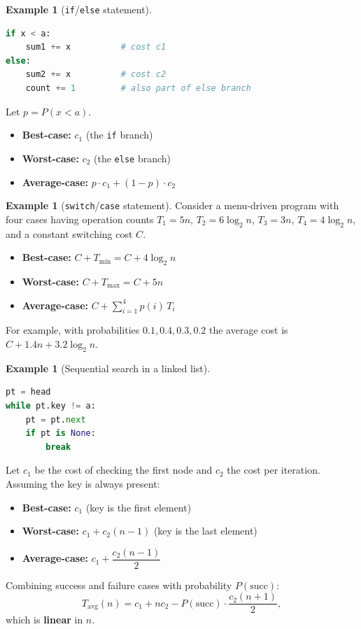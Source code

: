 \documentclass[11pt, a4paper, notitlepage]{report}
\theoremstyle{definition}
\theoremstyle{remark}
\theoremstyle{definition}
\newtheorem{example}[theorem]{Example}
\begin{document}
\begin{example}[\texttt{if}/\texttt{else} statement]
\label{ex:if-else}
\leavevmode
\begin{lstlisting}[language=Python]
if x < a:
    sum1 += x          # cost c1
else:
    sum2 += x          # cost c2
    count += 1         # also part of else branch
\end{lstlisting}
Let $p = P(x < a)$.
\begin{itemize}
  \item \textbf{Best-case:} $c_1$ (the \texttt{if} branch)
  \item \textbf{Worst-case:} $c_2$ (the \texttt{else} branch)
  \item \textbf{Average-case:} $p \cdot c_1 + (1-p) \cdot c_2$
\end{itemize}
\end{example}

\begin{example}[\texttt{switch}/\texttt{case} statement]
\label{ex:switch-case}
Consider a menu-driven program with four cases having operation counts
$T_1 = 5n$, $T_2 = 6\log_2 n$, $T_3 = 3n$, $T_4 = 4\log_2 n$, and
a constant switching cost $C$.
\begin{itemize}
  \item \textbf{Best-case:} $C + T_{\min} = C + 4\log_2 n$
  \item \textbf{Worst-case:} $C + T_{\max} = C + 5n$
  \item \textbf{Average-case:} $C + \sum_{i=1}^{4} p(i)\,T_i$
\end{itemize}
For example, with probabilities $0.1, 0.4, 0.3, 0.2$ the average cost is
$C + 1.4n + 3.2\log_2 n$.
\end{example}

\begin{example}[Sequential search in a linked list]
\label{ex:linear-search}
\leavevmode
\begin{lstlisting}[language=Python]
pt = head
while pt.key != a:
    pt = pt.next
    if pt is None:
        break
\end{lstlisting}
Let $c_1$ be the cost of checking the first node and $c_2$ the cost per iteration.
Assuming the key is always present:
\begin{itemize}
  \item \textbf{Best-case:} $c_1$ (key is the first element)
  \item \textbf{Worst-case:} $c_1 + c_2(n-1)$ (key is the last element)
  \item \textbf{Average-case:} $c_1 + \dfrac{c_2(n-1)}{2}$
\end{itemize}
Combining success and failure cases with probability $P(\text{succ})$:
\[
  T_{\text{avg}}(n) = c_1 + nc_2 - P(\text{succ})\cdot\frac{c_2(n+1)}{2},
\]
which is \textbf{linear} in $n$.
\end{example}
\end{document}
